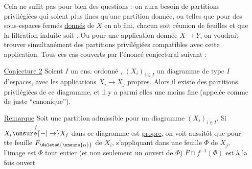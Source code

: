 Cela ne suffit pas pour bien des questions : on aura besoin de partitions privilégiées qui  soient plus fines qu'une partition  donnée,  ou telles que  pour des sous-espaces fermés \uline{donnés}  de $X$ en nb fini, chacun soit réunion de feuilles et que la filtration induite soit . Ou pour une application donnée $X\to Y$, on voudrait trouver simultanément des partitions privilégiées compatibles avec cette application. Tous ces cas  couverts par l'énoncé conjectural suivant :

\uline{Conjecture 2} Soient $I$ un ens. ordonné , $(X_i)_{i\in I}$ un diagramme de type $I$ d'espaces, avec les applications $X_i\to X_j$ \uline{propres}. Alors il existe des partitions privilégiées de ce diagramme, et il y a parmi elles une moins fine (appelée comme de juste ``canonique'').

\uline{Remarque} Soit une  partition admissible pour un diagramme $(X_i)_{i\in I}$. Si $X_i\overset{f}{\unsure{-|\to}}X_j$ dans ce diagramme est \uline{propre}, on voit aussitôt que pour tte feuille $F_{\deleted{\unsure{\alpha}}}$ de $X_i$, s'appliquant  dans une feuille $\Phi$ de $X_j$, l'image est $\Phi$ tout entier (et non seulement un ouvert de $\Phi$)   $\overline F\cap f^{-1}(\Phi)$ est à la fois ouvert 

